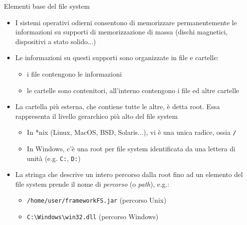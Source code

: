 \documentclass[xcolor=dvipsnames,presentation]{beamer}
\begin{document}
\begin{frame}{Elementi base del file system}
  \begin{itemize}
    \item I sistemi operativi odierni consentono di memorizzare permanentemente le informazioni su
supporti di memorizzazione di massa (dischi magnetici, dispositivi a stato solido...)
    \item Le informazioni su questi supporti sono organizzate in file e cartelle:
      \begin{itemize}
        \item i file contengono le informazioni
        \item le cartelle sono contenitori, all'interno contengono i file ed altre cartelle
      \end{itemize}
    \item La cartella più esterna, che contiene tutte le altre, è detta root. Essa rappresenta il livello gerarchico più alto del file system
      \begin{itemize}
        \item In *nix (Linux, MacOS, BSD, Solaris...), vi è una unica radice, ossia \texttt{/}
        \item In Windows, c'è una root per file system identificata da una lettera di unità (e.g.
\texttt{C:}, \texttt{D:})
      \end{itemize}
    \item La stringa che descrive un intero percorso dalla root fino ad un elemento del file system
prende il nome di \emph{percorso} (o \emph{path}), e.g.:
    \begin{itemize}
        \item \texttt{/home/user/frameworkFS.jar} (percorso Unix)
        \item \texttt{C:\textbackslash{}Windows\textbackslash{}win32.dll} (percorso Windows)
    \end{itemize}
  \end{itemize}
\end{frame}
\end{document}
